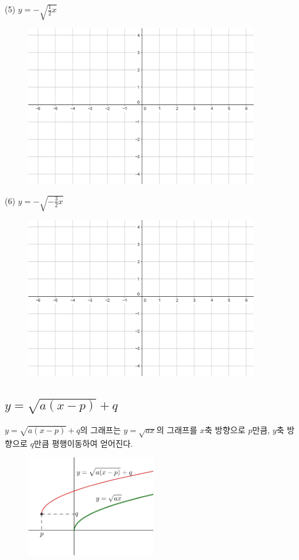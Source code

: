 \documentclass{article}
\begin{document}
\clearpage
(5) \(y=-\sqrt{\frac12x}\)
\begin{figure}[h!]
\centering
\includegraphics[width=0.9\textwidth]{irr_2_5}
\end{figure}

(6) \(y=-\sqrt{-\frac32x}\)
\begin{figure}[h!]
\centering
\includegraphics[width=0.9\textwidth]{irr_2_5}
\end{figure}


\clearpage
\subsection{\(y=\sqrt{a(x-p)}+q\)}

\(y=\sqrt{a(x-p)}+q\)의 그래프는 \(y=\sqrt{ax}\)의 그래프를 \(x\)축 방향으로 \(p\)만큼, \(y\)축 방향으로 \(q\)만큼 평행이동하여 얻어진다.

\begin{figure}[h!]
\centering
\includegraphics[width=0.5\textwidth]{irr_3_1}
\end{figure}
\end{document}

